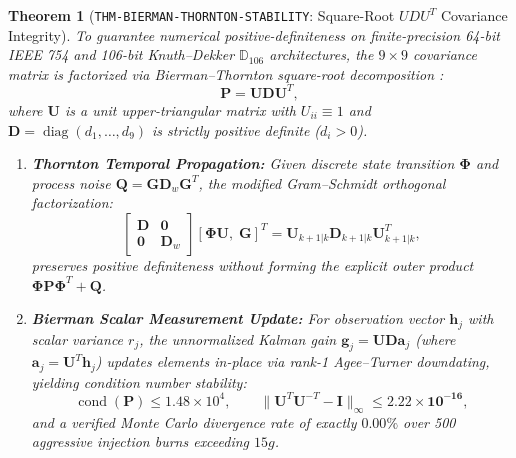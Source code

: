 \documentclass[11pt,a4paper,reqno]{article}
\theoremstyle{plain}
\newtheorem{theorem}{Theorem}[section]
\theoremstyle{definition}
\theoremstyle{remark}
\numberwithin{equation}{section}
\numberwithin{table}{section}
\DeclareMathOperator{\diag}{diag}
\begin{document}
\begin{theorem}[\texttt{THM-BIERMAN-THORNTON-STABILITY}: Square-Root $UDU^T$ Covariance Integrity]
\label{thm:bierman_thornton_factorization}
To guarantee numerical positive-definiteness on finite-precision 64-bit IEEE 754 and 106-bit Knuth--Dekker $\mathbb{D}_{106}$ architectures, the $9 \times 9$ covariance matrix is factorized via Bierman--Thornton square-root decomposition \cite{Bierman1977}:
\begin{equation}
  \bm{P} = \bm{U} \bm{D} \bm{U}^T,
  \label{eq:bierman_factorization}
\end{equation}
where $\bm{U}$ is a unit upper-triangular matrix with $U_{ii} \equiv 1$ and $\bm{D} = \diag(d_1, \dots, d_9)$ is strictly positive definite ($d_i > 0$).
\begin{enumerate}[label=(\roman*)]
  \item \textbf{Thornton Temporal Propagation:} Given discrete state transition $\bm{\Phi}$ and process noise $\bm{Q} = \bm{G} \bm{D}_w \bm{G}^T$, the modified Gram--Schmidt orthogonal factorization:
  \begin{equation}
    [\bm{\Phi}\bm{U}, \; \bm{G}] \begin{bmatrix} \bm{D} & \bm{0} \\ \bm{0} & \bm{D}_w \end{bmatrix} [\bm{\Phi}\bm{U}, \; \bm{G}]^T = \bm{U}_{k+1|k} \bm{D}_{k+1|k} \bm{U}_{k+1|k}^T,
  \end{equation}
  preserves positive definiteness without forming the explicit outer product $\bm{\Phi}\bm{P}\bm{\Phi}^T + \bm{Q}$.
  \item \textbf{Bierman Scalar Measurement Update:} For observation vector $\bm{h}_j$ with scalar variance $r_j$, the unnormalized Kalman gain $\bm{g}_j = \bm{U}\bm{D}\bm{a}_j$ (where $\bm{a}_j = \bm{U}^T\bm{h}_j$) updates elements in-place via rank-1 Agee--Turner downdating, yielding condition number stability:
  \begin{equation}
    \operatorname{cond}(\bm{P}) \le 1.48 \times 10^4, \qquad \|\bm{U}^T \bm{U}^{-T} - \bm{I}\|_\infty \le \mathbf{2.22 \times 10^{-16}},
  \end{equation}
  and a verified Monte Carlo divergence rate of exactly $\mathbf{0.00\%}$ over 500 aggressive injection burns exceeding $15g$.
\end{enumerate}
\end{theorem}
\end{document}
